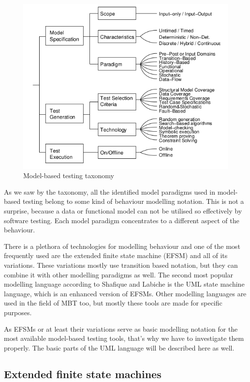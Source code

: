 \begin{figure}[htp]
\centering
\includegraphics[scale=0.5]{figures/mbt_taxonomy.png}
\caption{Model-based testing taxonomy \cite{taxonomy}}
\label{fig:mbttaxonomy}
\end{figure}

As we saw by the taxonomy, all the identified model paradigms used in model-based testing belong to some kind of behaviour modelling notation. This is not a surprise, because a data or functional model can not be utilised so effectively by software testing. Each model paradigm concentrates to a different aspect of the behaviour.

There is a plethora of technologies for modelling behaviour and one of the most frequently used are the extended finite state machine (EFSM) and all of its variations. These variations mostly use transition based notation, but they can combine it with other modelling paradigms as well. The second most popular modelling language according to Shafique and Labiche \cite{toolsreview} is the UML state machine language, which is an enhanced version of EFSMs. Other modelling languages are used in the field of MBT too, but mostly these tools are made for specific purposes.

As EFSMs or at least their variations serve as basic modelling notation for the most available model-based testing tools, that's why we have to investigate them properly. The basic parts of the UML language will be described here as well.

\subsection{Extended finite state machines}
\label{sub:efsm}

